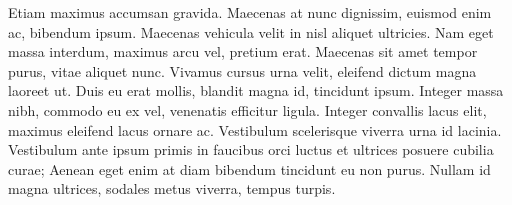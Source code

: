 \documentclass[
  12pt,
]{article}
\begin{document}
Etiam maximus accumsan gravida. Maecenas at nunc dignissim, euismod enim
ac, bibendum ipsum. Maecenas vehicula velit in nisl aliquet ultricies.
Nam eget massa interdum, maximus arcu vel, pretium erat. Maecenas sit
amet tempor purus, vitae aliquet nunc. Vivamus cursus urna velit,
eleifend dictum magna laoreet ut. Duis eu erat mollis, blandit magna id,
tincidunt ipsum. Integer massa nibh, commodo eu ex vel, venenatis
efficitur ligula. Integer convallis lacus elit, maximus eleifend lacus
ornare ac. Vestibulum scelerisque viverra urna id lacinia. Vestibulum
ante ipsum primis in faucibus orci luctus et ultrices posuere cubilia
curae; Aenean eget enim at diam bibendum tincidunt eu non purus. Nullam
id magna ultrices, sodales metus viverra, tempus turpis.
\end{document}
